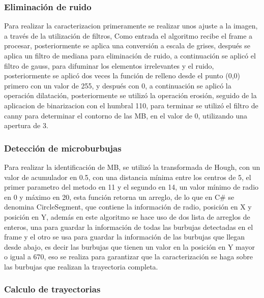 \documentclass[12pt,twocolumn,a4paper]{article}
\begin{document}
\subsubsection{Eliminación de ruido}

Para realizar la caracterizacion primeramente se realizar unos ajuste a la imagen, a través de la utilización de filtros, Como entrada el algoritmo recibe el frame a procesar, posteriormente se aplica una conversión  a escala de grises, después se aplica un filtro de mediana para eliminación de ruido, a continuación se aplicó el filtro de  gauss, para difuminar los elementos irrelevantes y el ruido, posteriormente se aplicó dos veces la función de relleno desde el punto (0,0) primero con un valor de 255, y después con 0, a continuación se aplicó la operación dilatación, posteriormente se utilizó la operación erosión, seguido de la aplicacion de binarizacion con el humbral  110,  para terminar se  utilizó el filtro de canny para determinar el contorno de las MB, en el valor de 0, utilizando una apertura de 3.


\subsubsection{Detección de microburbujas}

Para realizar la identificación de MB, se utilizó la transformada de Hough, con un valor de acumulador en 0.5, con una distancia mínima entre los centros de 5, el primer parametro del metodo en 11 y el segundo en 14, un valor mínimo de radio en 0 y máximo en 20, esta función retorna un arreglo, de lo que en C\# se denomina CircleSegment, que contiene la información de radio, posición en X y posición en Y, además en este algoritmo se hace uso de dos lista de arreglos de enteros, una para guardar la información de todas las burbujas detectadas en el frame y el otro se usa para guardar la información de las burbujas que llegan desde abajo, es decir las burbujas que tienen un valor en la posición en Y mayor o igual a 670, eso se realiza para garantizar que la  caracterización se haga sobre las burbujas que realizan la trayectoria completa. 


\subsubsection{Calculo de trayectorias}
\end{document}
